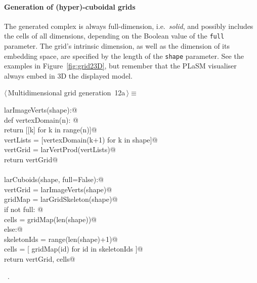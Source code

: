 \documentclass[11pt,oneside]{article}	%
\begin{document}
\paragraph{Generation of (hyper)-cuboidal grids}

The generated complex is always full-dimension, i.e.~\emph{solid}, and possibly includes the cells of all dimensions, depending on the Boolean value of the \texttt{full} parameter.
The grid's intrinsic dimension, as well as the dimension of its embedding space, are specified by the length of the \texttt{shape} parameter. See the examples in Figure~\ref{fig:grid23D}, but remember that the PLaSM visualiser always embed in 3D the displayed model. 

\begin{flushleft} \small \label{scrap16}
\protect{}$\langle\,$Multidimensional grid generation\nobreak\ {\footnotesize 12a}$\,\rangle\equiv$
\vspace{-1ex}
\begin{list}{}{} \item
\mbox{}\verb@def larImageVerts(shape):@\\
\mbox{}\verb@   def vertexDomain(n): @\\
\mbox{}\verb@      return [[k] for k in range(n)]@\\
\mbox{}\verb@   vertLists = [vertexDomain(k+1) for k in shape]@\\
\mbox{}\verb@   vertGrid = larVertProd(vertLists)@\\
\mbox{}\verb@   return vertGrid@\\
\mbox{}\verb@@\\
\mbox{}\verb@def larCuboids(shape, full=False):@\\
\mbox{}\verb@   vertGrid = larImageVerts(shape)@\\
\mbox{}\verb@   gridMap = larGridSkeleton(shape)@\\
\mbox{}\verb@   if not full: @\\
\mbox{}\verb@      cells = gridMap(len(shape))@\\
\mbox{}\verb@   else:@\\
\mbox{}\verb@      skeletonIds = range(len(shape)+1)@\\
\mbox{}\verb@      cells = [ gridMap(id) for id in skeletonIds ]@\\
\mbox{}\verb@   return vertGrid, cells@\\
\mbox{}\verb@@{\NWsep}
\end{list}
\vspace{-1ex}
\footnotesize\addtolength{\baselineskip}{-1ex}
\begin{list}{}{\setlength{\itemsep}{-\parsep}\setlength{\itemindent}{-\leftmargin}}
\item \NWtxtMacroRefIn\ .
\end{list}
\end{flushleft}
\end{document}
